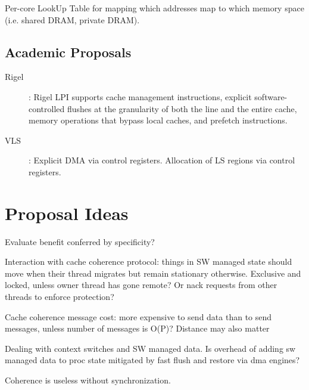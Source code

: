 Per-core LookUp Table for mapping which addresses map to which memory space (i.e. shared DRAM, private DRAM).

\subsection{Academic Proposals}


\begin{description}
\item [Rigel]: Rigel LPI supports cache management instructions, explicit software-controlled flushes at the granularity of both the line and the entire cache, memory operations that bypass local caches, and prefetch instructions. \cite{kelm-isca09}
\item [VLS]: Explicit DMA via control registers. Allocation of LS regions via control registers.
\end{description}

\section{Proposal Ideas}

Evaluate benefit conferred by specificity?

Interaction with cache coherence protocol: things in SW managed state should move when their thread migrates but remain stationary otherwise. Exclusive and locked, unless owner thread has gone remote? Or nack requests from other threads to enforce protection?

Cache coherence message cost: more expensive to send data than to send messages, unless number of messages is O(P)? Distance may also matter

Dealing with context switches and SW managed data. Is overhead of adding sw managed data to proc state mitigated by fast flush and restore via dma engines?

Coherence is useless without synchronization.

